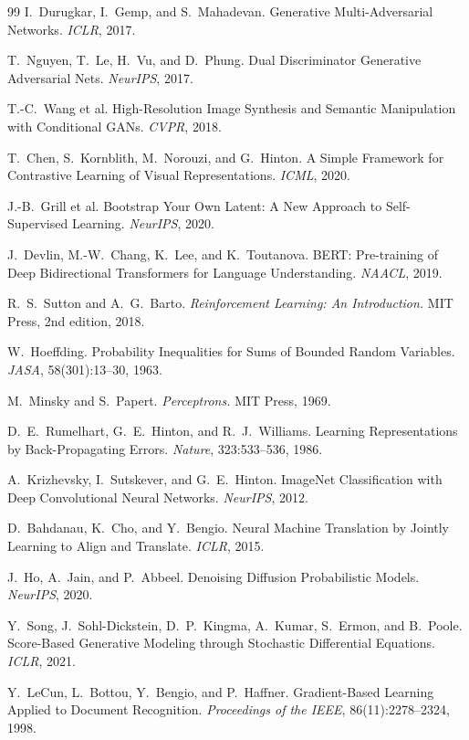 \documentclass[12pt,a4paper]{article}
\theoremstyle{definition}
\begin{document}
\begin{thebibliography}{99}
 I.~Durugkar, I.~Gemp, and S.~Mahadevan. Generative Multi-Adversarial Networks. \emph{ICLR}, 2017.

 T.~Nguyen, T.~Le, H.~Vu, and D.~Phung. Dual Discriminator Generative Adversarial Nets. \emph{NeurIPS}, 2017.

 T.-C.~Wang et al. High-Resolution Image Synthesis and Semantic Manipulation with Conditional GANs. \emph{CVPR}, 2018.

 T.~Chen, S.~Kornblith, M.~Norouzi, and G.~Hinton. A Simple Framework for Contrastive Learning of Visual Representations. \emph{ICML}, 2020.

 J.-B.~Grill et al. Bootstrap Your Own Latent: A New Approach to Self-Supervised Learning. \emph{NeurIPS}, 2020.

 J.~Devlin, M.-W.~Chang, K.~Lee, and K.~Toutanova. BERT: Pre-training of Deep Bidirectional Transformers for Language Understanding. \emph{NAACL}, 2019.

 R.~S.~Sutton and A.~G.~Barto. \emph{Reinforcement Learning: An Introduction.} MIT Press, 2nd edition, 2018.

 W.~Hoeffding. Probability Inequalities for Sums of Bounded Random Variables. \emph{JASA}, 58(301):13--30, 1963.

 M.~Minsky and S.~Papert. \emph{Perceptrons.} MIT Press, 1969.

 D.~E.~Rumelhart, G.~E.~Hinton, and R.~J.~Williams. Learning Representations by Back-Propagating Errors. \emph{Nature}, 323:533--536, 1986.

 A.~Krizhevsky, I.~Sutskever, and G.~E.~Hinton. ImageNet Classification with Deep Convolutional Neural Networks. \emph{NeurIPS}, 2012.

 D.~Bahdanau, K.~Cho, and Y.~Bengio. Neural Machine Translation by Jointly Learning to Align and Translate. \emph{ICLR}, 2015.

 J.~Ho, A.~Jain, and P.~Abbeel. Denoising Diffusion Probabilistic Models. \emph{NeurIPS}, 2020.

 Y.~Song, J.~Sohl-Dickstein, D.~P.~Kingma, A.~Kumar, S.~Ermon, and B.~Poole. Score-Based Generative Modeling through Stochastic Differential Equations. \emph{ICLR}, 2021.

 Y.~LeCun, L.~Bottou, Y.~Bengio, and P.~Haffner. Gradient-Based Learning Applied to Document Recognition. \emph{Proceedings of the IEEE}, 86(11):2278--2324, 1998.

\end{thebibliography}
\end{document}
